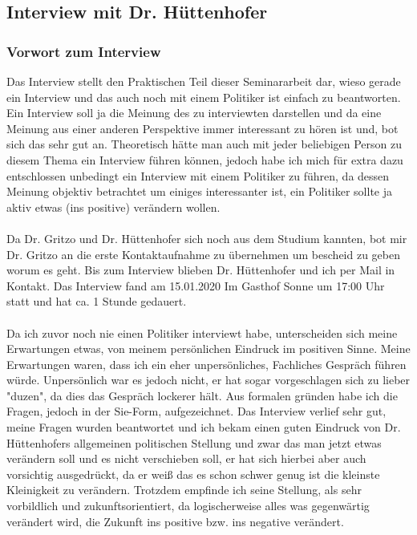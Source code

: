 \newpage
\subsection{Interview mit Dr. Hüttenhofer}

\subsubsection{Vorwort zum Interview}
Das Interview stellt den Praktischen Teil dieser Seminararbeit dar, wieso gerade ein Interview und das auch noch mit einem Politiker ist einfach zu beantworten. Ein Interview soll ja die Meinung des zu interviewten darstellen und da eine Meinung aus einer anderen Perspektive immer interessant zu hören ist und, bot sich das sehr gut an. Theoretisch hätte man auch mit jeder beliebigen Person zu diesem Thema ein Interview führen können, jedoch habe ich mich für extra dazu entschlossen unbedingt ein Interview mit einem Politiker zu führen, da dessen Meinung objektiv betrachtet um einiges interessanter ist, ein Politiker sollte ja aktiv etwas (ins positive) verändern wollen.\\
\\
Da Dr. Gritzo und Dr. Hüttenhofer sich noch aus dem Studium kannten, bot mir Dr. Gritzo an die erste Kontaktaufnahme zu übernehmen um bescheid zu geben worum es geht. Bis zum Interview blieben Dr. Hüttenhofer und ich per Mail in Kontakt. Das Interview fand am 15.01.2020 Im Gasthof \glqq Sonne\grqq{} um 17:00 Uhr statt und hat ca. 1 Stunde gedauert.\\
\\
Da ich zuvor noch nie einen Politiker interviewt habe, unterscheiden sich meine Erwartungen etwas, von meinem persönlichen Eindruck im positiven Sinne. Meine Erwartungen waren, dass ich ein eher unpersönliches, Fachliches Gespräch führen würde. Unpersönlich war es jedoch nicht, er hat sogar vorgeschlagen sich zu lieber "duzen", da dies das Gespräch lockerer hält. Aus formalen gründen habe ich die Fragen, jedoch in der \glqq Sie\grqq{}-Form, aufgezeichnet. Das Interview verlief sehr gut, meine Fragen wurden beantwortet und ich bekam einen guten Eindruck von Dr. Hüttenhofers allgemeinen politischen Stellung und zwar das man jetzt etwas verändern soll und es nicht verschieben soll, er hat sich hierbei aber auch vorsichtig ausgedrückt, da er weiß das es schon schwer genug ist die kleinste Kleinigkeit zu verändern. Trotzdem empfinde ich seine Stellung, als sehr vorbildlich und zukunftsorientiert, da logischerweise alles was gegenwärtig verändert wird, die Zukunft ins positive bzw. ins negative verändert.\\
